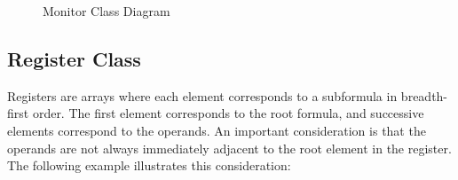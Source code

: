 \begin{figure}[h]
  \caption{Monitor Class Diagram}
  \label{fig:monitorClassDiagram}
\end{figure}

\subsection{Register Class}
\label{sec:RegisterClass}

Registers are arrays where each element corresponds to a subformula in breadth-first order.  The first element corresponds to the root formula, and successive elements correspond to the operands.  An important consideration is that the operands are not always immediately adjacent to the root element in the register.  The following example illustrates this consideration:\\

